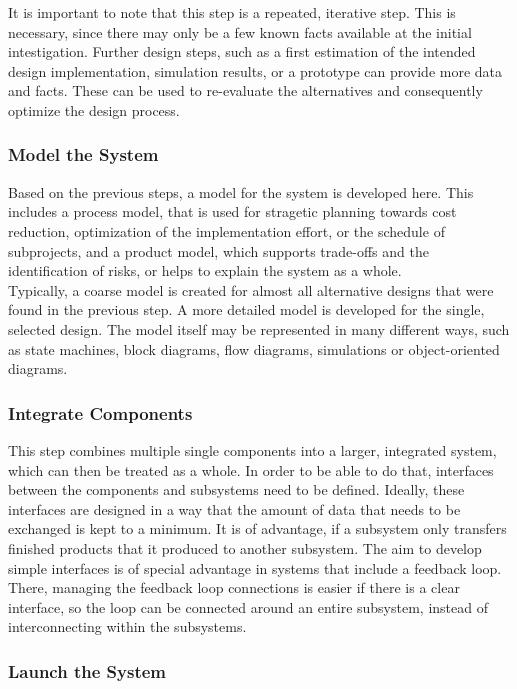 It is important to note that this step is a repeated, iterative step.
This is necessary, since there may only be a few known facts available at the initial intestigation.
Further design steps, such as a first estimation of the intended design implementation, simulation results, or a prototype can provide more data and facts.
These can be used to re-evaluate the alternatives and consequently optimize the design process.


\subsubsection{Model the System}

Based on the previous steps, a model for the system is developed here.
This includes a process model, that is used for stragetic planning towards cost reduction, optimization of the implementation effort, or the schedule of subprojects, and a product model, which supports trade-offs and the identification of risks, or helps to explain the system as a whole.\\

Typically, a coarse model is created for almost all alternative designs that were found in the previous step.
A more detailed model is developed for the single, selected design.
The model itself may be represented in many different ways, such as state machines, block diagrams, flow diagrams, simulations or object-oriented diagrams.

\subsubsection{Integrate Components}

This step combines multiple single components into a larger, integrated system, which can then be treated as a whole.
In order to be able to do that, interfaces between the components and subsystems need to be defined.
Ideally, these interfaces are designed in a way that the amount of data that needs to be exchanged is kept to a minimum.
It is of advantage, if a subsystem only transfers finished products that it produced to another subsystem.
The aim to develop simple interfaces is of special advantage in systems that include a feedback loop.
There, managing the feedback loop connections is easier if there is a clear interface, so the loop can be connected around an entire subsystem, instead of interconnecting within the subsystems.

\subsubsection{Launch the System}

